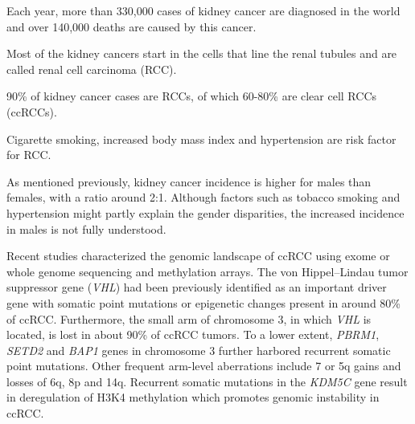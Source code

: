 Each year, more than 330,000 cases of kidney cancer are diagnosed in the world and over 140,000 deaths are caused by this cancer\cite{Ferlay2015}.
\begin{comment}
  Kidney cancer accounts for 2.4\% of all adult cancers and over 140,000 deaths annually (GLOBOCAN 2012 v1.0, Cancer Incidence and Mortality Worldwide: IARC CancerBase No. 11 [Internet]. (International Agency for Research on Cancer; 2013), Available from http://globocan.iarc.fr, accessed on 5 February (2014).)
\end{comment}
Most of the kidney cancers start in the cells that line the renal tubules and are called renal cell carcinoma (RCC).
\begin{comment}
  Tubule are the part of the nephron (~1M per kidney) that contains the fluid filtered by upstream by the renal corpuscle
  Other types of kidney cancers: Wilms' tumor (nephroblastoma, abnormal proliferation of cells that resemble the kidney cells of an embryo), Clear cell sarcoma of kidney (starts in the connective tissues or blood vessels).
\end{comment}
90\% of kidney cancer cases are RCCs, of which 60-80\% are clear cell RCCs (ccRCCs).
\begin{comment}
  Recognized environmental and lifestyle risk factors for RCC include tobacco smoking, excess body weight and hypertension, as well as a history of chronic kidney diseases.
\end{comment}
Cigarette smoking, increased body mass index and hypertension are risk factor for RCC\cite{Chow2000}.
\begin{comment}
  Cigarette smoking is a risk factor and associated with cancer stage.
  Increased body mass index is also an independent risk factor for RCC, while hypertension doubles the risk of RCC.  
\end{comment}
As mentioned previously, kidney cancer incidence is higher for males than females, with a ratio around 2:1.
Although factors such as tobacco smoking and hypertension might partly explain the gender disparities, the increased incidence in males is not fully understood.

Recent studies characterized the genomic landscape of ccRCC using exome\cite{Sato2013} or whole genome sequencing\cite{Scelo2014} and methylation arrays\cite{Sato2013}.
The von Hippel–Lindau tumor suppressor gene ({\it VHL}) had been previously identified as an important driver gene with somatic point mutations or epigenetic changes present in around 80\% of ccRCC\cite{Latif1993,Banks2006}.
Furthermore, the small arm of chromosome 3, in which {\it VHL} is located, is lost in about 90\% of ccRCC tumors\cite{Frew2015}.
To a lower extent, {\it PBRM1}, {\it SETD2} and {\it BAP1} genes in chromosome 3 further harbored recurrent somatic point mutations\cite{Benusiglio2015,Carvalho2014,Popova2013}.
Other frequent arm-level aberrations include 7 or 5q gains and losses of 6q, 8p and 14q\cite{Baudis2007,Frew2015,Ito2016}.
Recurrent somatic mutations in the {\it KDM5C} gene result in deregulation of H3K4 methylation which promotes genomic instability in ccRCC\cite{Scelo2014,Dalgliesh2010}.



